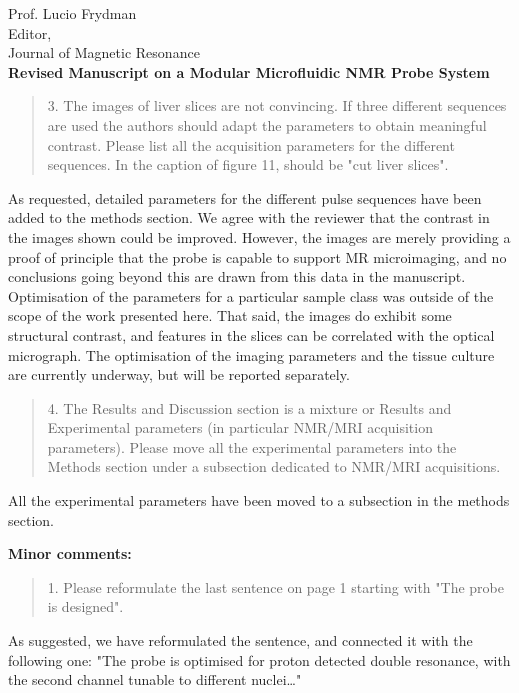 \documentclass{mu-soton-letter}
\newenvironment{reviewer} {\begin{quote}\color{black!50}} {\end{quote}}
\begin{document}
\begin{letter}{Prof. Lucio Frydman\\
  Editor,\\
  Journal of Magnetic Resonance\\[2cm]
  \textbf{Revised Manuscript on a Modular Microfluidic NMR Probe System}}
\begin{reviewer}
3.      The images of liver slices are not convincing.  If three different sequences are used the authors should adapt the parameters to obtain meaningful contrast. Please list all the acquisition parameters for the different sequences. In the caption of figure 11, should be "cut liver slices".
\end{reviewer}
As requested, detailed parameters for the different pulse
sequences have been added to the methods section.
We agree with the reviewer that the contrast in the images shown could be
improved. However,
the images are merely providing a proof
of principle that the probe is capable to support MR microimaging, and no
conclusions going beyond this are drawn from this data in the manuscript.
Optimisation of the parameters for a particular sample class was outside of the
scope of the work presented here. That said, the images do exhibit some
structural contrast, and features in the slices can be correlated with the
optical micrograph. The optimisation of the imaging parameters and the
tissue culture are currently underway, but will be reported separately.

\clearpage
\begin{reviewer}
4.      The Results and Discussion section is a mixture or Results and Experimental parameters (in particular NMR/MRI acquisition parameters). Please move all the experimental parameters into the Methods section under a subsection dedicated to NMR/MRI acquisitions.
\end{reviewer}
All the experimental parameters have been moved to a subsection in the methods section.

\textcolor{black!50}{ \textbf{Minor comments:}}
\begin{reviewer}
1.      Please reformulate the last sentence on page 1 starting with "The probe is designed".
\end{reviewer}
As suggested, we have reformulated the sentence, and connected it with the following one:
"The probe is optimised for proton detected double resonance, with the
second channel tunable to different nuclei\ldots"
\vspace{3cm}


\end{letter}
\end{document}
